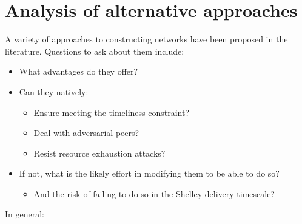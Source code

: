 \documentclass[11pt,a4paper]{article}
\begin{document}
\section{Analysis of alternative approaches}
\label{analysis-of-alternative-approaches}

A variety of approaches to constructing networks have been proposed in
the literature. Questions to ask about them include:

\begin{itemize}
\item
  What advantages do they offer?
\item
  Can they natively:

  \begin{itemize}
  \item
    Ensure meeting the timeliness constraint?
  \item
    Deal with adversarial peers?
  \item
    Resist resource exhaustion attacks?
  \end{itemize}
\item
  If not, what is the likely effort in modifying them to be able to do
  so?

  \begin{itemize}
  \item
    And the risk of failing to do so in the Shelley delivery timescale?
  \end{itemize}
\end{itemize}

In general:
\end{document}
